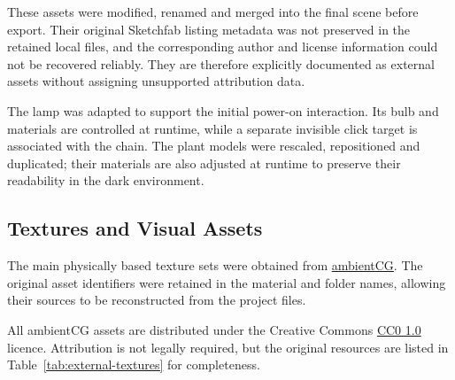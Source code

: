 \documentclass{report}
\begin{document}
These assets were modified, renamed and merged into the final scene
before export. Their original Sketchfab listing metadata was not
preserved in the retained local files, and the corresponding author and
license information could not be recovered reliably. They are therefore
explicitly documented as external assets without assigning unsupported
attribution data.

The lamp was adapted to support the initial power-on interaction. Its
bulb and materials are controlled at runtime, while a separate invisible
click target is associated with the chain. The plant models were
rescaled, repositioned and duplicated; their materials are also adjusted
at runtime to preserve their readability in the dark environment.

\subsection{Textures and Visual Assets}

The main physically based texture sets were obtained from
\href{https://ambientcg.com/}{ambientCG}. The original asset identifiers
were retained in the material and folder names, allowing their sources
to be reconstructed from the project files.

All ambientCG assets are distributed under the Creative Commons
\href{https://creativecommons.org/publicdomain/zero/1.0/}{CC0 1.0}
licence. Attribution is not legally required, but the original resources
are listed in Table~\ref{tab:external-textures} for completeness.
\end{document}
